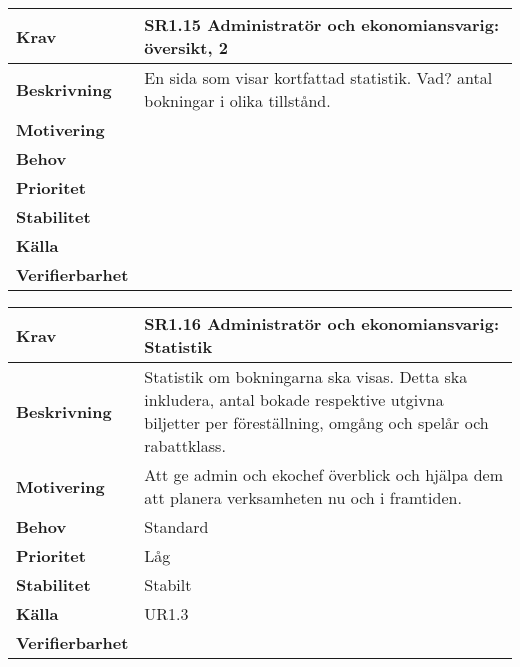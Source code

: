 \documentclass[a4paper, twoside, 11pt, titlepage]{article}
\begin{document}
	\begin{tabular} { p{2.6cm} p{12.5cm} }
		\hline
		\sffamily\textbf{Krav} & \sffamily\textbf{SR1.15 Administratör och ekonomiansvarig: översikt, 2 } \\
		\hline
		\sffamily\textbf{Beskrivning} & En sida som visar kortfattad statistik. Vad? antal bokningar i olika tillstånd.  \\
		\hline
		\sffamily\textbf{Motivering} &   \\
		\hline
		\sffamily\textbf{Behov} &   \\
		\hline
		\sffamily\textbf{Prioritet} &   \\
		\hline
		\sffamily\textbf{Stabilitet} &   \\
		\hline
		\sffamily\textbf{Källa} &   \\
		\hline
		\sffamily\textbf{Verifierbarhet} &   \\
		\hline
	\end{tabular}
	\vspace{6mm}

	\begin{tabular} { p{2.6cm} p{12.5cm} }
		\hline
		\sffamily\textbf{Krav} & \sffamily\textbf{SR1.16 Administratör och ekonomiansvarig: Statistik } \\
		\hline
		\sffamily\textbf{Beskrivning} & Statistik om bokningarna ska visas. Detta ska inkludera, antal bokade respektive utgivna biljetter per föreställning, omgång och spelår och rabattklass.  \\
		\hline
		\sffamily\textbf{Motivering} & Att ge admin och ekochef överblick och hjälpa dem att planera verksamheten nu och i framtiden.  \\
		\hline
		\sffamily\textbf{Behov} & Standard  \\
		\hline
		\sffamily\textbf{Prioritet} & Låg  \\
		\hline
		\sffamily\textbf{Stabilitet} & Stabilt  \\
		\hline
		\sffamily\textbf{Källa} & UR1.3  \\
		\hline
		\sffamily\textbf{Verifierbarhet} &   \\
		\hline
	\end{tabular}
	\vspace{6mm}
\end{document}
